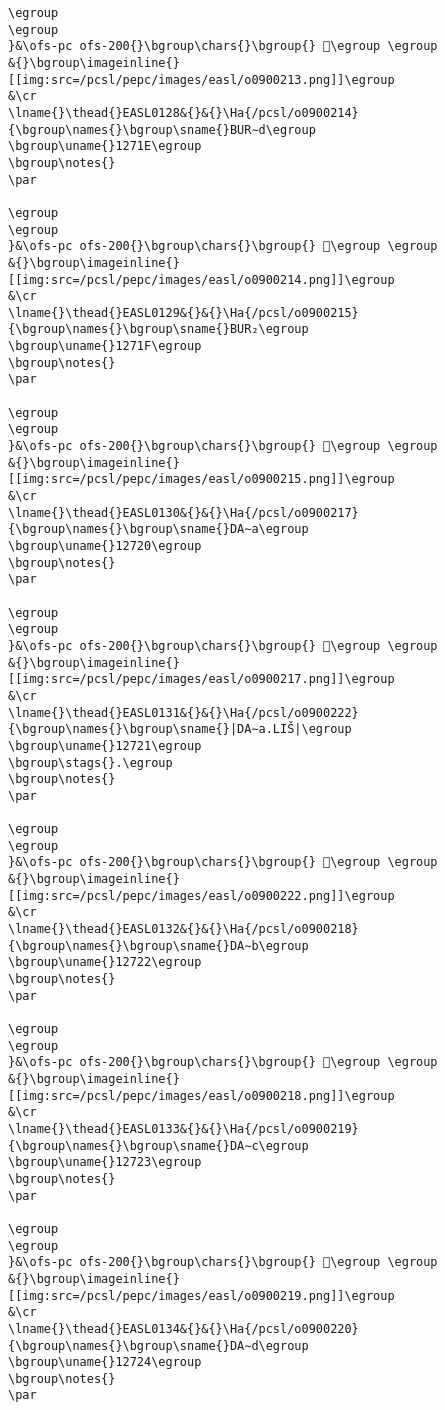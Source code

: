 \begin{verbatim}
\egroup
\egroup
}&\ofs-pc ofs-200{}\bgroup\chars{}\bgroup{} 𒜝\egroup \egroup
&{}\bgroup\imageinline{}[[img:src=/pcsl/pepc/images/easl/o0900213.png]]\egroup
&\cr
\lname{}\thead{}EASL0128&{}&{}\Ha{/pcsl/o0900214}{\bgroup\names{}\bgroup\sname{}BUR∼d\egroup
\bgroup\uname{}1271E\egroup
\bgroup\notes{}
\par 

\egroup
\egroup
}&\ofs-pc ofs-200{}\bgroup\chars{}\bgroup{} 𒜞\egroup \egroup
&{}\bgroup\imageinline{}[[img:src=/pcsl/pepc/images/easl/o0900214.png]]\egroup
&\cr
\lname{}\thead{}EASL0129&{}&{}\Ha{/pcsl/o0900215}{\bgroup\names{}\bgroup\sname{}BUR₂\egroup
\bgroup\uname{}1271F\egroup
\bgroup\notes{}
\par 

\egroup
\egroup
}&\ofs-pc ofs-200{}\bgroup\chars{}\bgroup{} 𒜟\egroup \egroup
&{}\bgroup\imageinline{}[[img:src=/pcsl/pepc/images/easl/o0900215.png]]\egroup
&\cr
\lname{}\thead{}EASL0130&{}&{}\Ha{/pcsl/o0900217}{\bgroup\names{}\bgroup\sname{}DA∼a\egroup
\bgroup\uname{}12720\egroup
\bgroup\notes{}
\par 

\egroup
\egroup
}&\ofs-pc ofs-200{}\bgroup\chars{}\bgroup{} 𒜠\egroup \egroup
&{}\bgroup\imageinline{}[[img:src=/pcsl/pepc/images/easl/o0900217.png]]\egroup
&\cr
\lname{}\thead{}EASL0131&{}&{}\Ha{/pcsl/o0900222}{\bgroup\names{}\bgroup\sname{}|DA∼a.LIŠ|\egroup
\bgroup\uname{}12721\egroup
\bgroup\stags{}.\egroup
\bgroup\notes{}
\par 

\egroup
\egroup
}&\ofs-pc ofs-200{}\bgroup\chars{}\bgroup{} 𒜡\egroup \egroup
&{}\bgroup\imageinline{}[[img:src=/pcsl/pepc/images/easl/o0900222.png]]\egroup
&\cr
\lname{}\thead{}EASL0132&{}&{}\Ha{/pcsl/o0900218}{\bgroup\names{}\bgroup\sname{}DA∼b\egroup
\bgroup\uname{}12722\egroup
\bgroup\notes{}
\par 

\egroup
\egroup
}&\ofs-pc ofs-200{}\bgroup\chars{}\bgroup{} 𒜢\egroup \egroup
&{}\bgroup\imageinline{}[[img:src=/pcsl/pepc/images/easl/o0900218.png]]\egroup
&\cr
\lname{}\thead{}EASL0133&{}&{}\Ha{/pcsl/o0900219}{\bgroup\names{}\bgroup\sname{}DA∼c\egroup
\bgroup\uname{}12723\egroup
\bgroup\notes{}
\par 

\egroup
\egroup
}&\ofs-pc ofs-200{}\bgroup\chars{}\bgroup{} 𒜣\egroup \egroup
&{}\bgroup\imageinline{}[[img:src=/pcsl/pepc/images/easl/o0900219.png]]\egroup
&\cr
\lname{}\thead{}EASL0134&{}&{}\Ha{/pcsl/o0900220}{\bgroup\names{}\bgroup\sname{}DA∼d\egroup
\bgroup\uname{}12724\egroup
\bgroup\notes{}
\par 


\end{verbatim}

